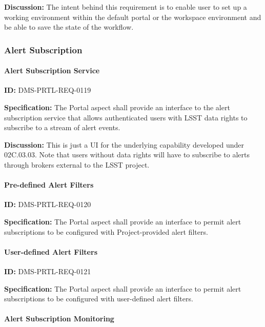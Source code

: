 \documentclass[SE,toc,lsstdraft]{lsstdoc}
\begin{document}
\textbf{Discussion:}
The intent behind this requirement is to enable user to set up a working environment within the default portal or the workspace environment and be able to save the state of the workflow.

\subsubsection{Alert Subscription}

\paragraph{Alert Subscription Service}\hfill  %

\label{DMS-PRTL-REQ-0119}
\textbf{ID:} DMS-PRTL-REQ-0119

\textbf{Specification:}
The Portal aspect shall provide an interface to the alert subscription service that allows authenticated users with LSST data rights to subscribe to a stream of alert events.

\textbf{Discussion:}
This is just a UI for the underlying capability developed under 02C.03.03.
Note that users without data rights will have to subscribe to alerts through brokers external to the LSST project.

\paragraph{Pre-defined Alert Filters}\hfill  %

\label{DMS-PRTL-REQ-0120}
\textbf{ID:} DMS-PRTL-REQ-0120

\textbf{Specification:}
The Portal aspect shall provide an interface to permit alert subscriptions to be configured with Project-provided alert filters.

\paragraph{User-defined Alert Filters}\hfill  %

\label{DMS-PRTL-REQ-0121}
\textbf{ID:} DMS-PRTL-REQ-0121

\textbf{Specification:}
The Portal aspect shall provide an interface to permit alert subscriptions to be configured with user-defined alert filters.

\paragraph{Alert Subscription Monitoring}\hfill  %
\end{document}
